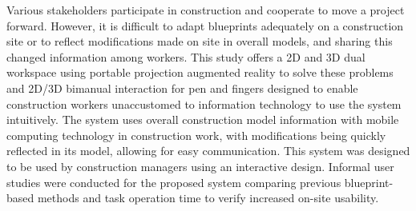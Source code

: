 
\begin{comment}
In the construction process, various stakeholders attend and cooperate with each other to move the project forward. However, it is currently difficult for architects' blueprints to be sufficiently adapted on a construction site, and there are many problems that have not been considered. It is also difficult to reflect modifications made on-site in overall models, and the difficulty in sharing this changed information between workers can be a problem. This system construction may be too complicated to be used on-site or 3D model information may not be offered, and since input technology is complicated, it is difficult to reflect this work information on-site. This study offers a 2D and 3D Dual Workspace using portable Projection AR to solve these problems, and 2D/3D Bimanual Interaction for pen and fingers was designed so that construction workers unused to IT can intuitively use the system. The system makes convenient use of overall construction model information using mobile computing technology within construction work, and modifications are quickly reflected in its model. Through this, it allows for easy communication. This system was designed to use interaction. It is designed for use by construction managers using an interactive design. Informal user studies were carried out for the proposed system comparing previous blueprint-based methods and task operation time to verify increased on-site usability. 
\end{comment}

Various stakeholders participate in construction and cooperate to move a project forward. However, it is difficult to adapt blueprints adequately on a construction site or to reflect modifications made on site in overall models, and sharing this changed information among workers. This study offers a 2D and 3D dual workspace using portable projection augmented reality to solve these problems and 2D/3D bimanual interaction for pen and fingers designed to enable construction workers unaccustomed to information technology to use the system intuitively. The system uses overall construction model information with mobile computing technology in construction work, with modifications being quickly reflected in its model, allowing for easy communication. This system was designed to be used by construction managers using an interactive design. Informal user studies were conducted for the proposed system comparing previous blueprint-based methods and task operation time to verify increased on-site usability.


